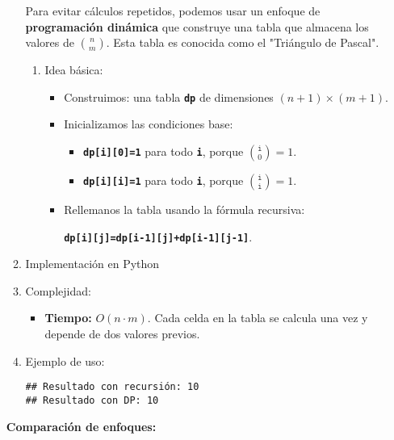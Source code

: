 \begin{enumerate}[label=\color{red}\textbf{\arabic*)}]
\begin{enumerate}[label=\color{red}\alph*)]
    Para evitar cálculos repetidos, podemos usar un enfoque de \textbf{programación dinámica} que construye una tabla que almacena los valores de $\binom{n}{m} $. Esta tabla es conocida como el "Triángulo de Pascal".
    \begin{enumerate}[label=\arabic*)]
      \item Idea básica:
        \begin{itemize}[label=\textbullet]
          \item Construimos: una tabla \textbf{\texttt{dp}} de dimensiones $(n+1)\times (m+1)$.
          \item Inicializamos las condiciones base:
            \begin{itemize}[label=\textbullet]
              \item \textbf{\texttt{dp[i][0]=1}} para todo \textbf{\texttt{i}}, porque $\binom{\mathtt{i} }{0}=1 $.
              \item \textbf{\texttt{dp[i][i]=1}} para todo \textbf{\texttt{i}}, porque $\binom{\mathtt{i}}{\mathtt{i}}=1$.
            \end{itemize}
          \item Rellemanos la tabla usando la fórmula recursiva:
            \begin{center}
              \textbf{\texttt{dp[i][j]=dp[i-1][j]+dp[i-1][j-1]}}. 
            \end{center}
        \end{itemize}
    \end{enumerate}
  \item Implementación en Python
    
  \item Complejidad:
    \begin{itemize}[label=\textbullet]
      \item \textbf{Tiempo:} $O(n\cdot m)$. Cada celda en la tabla se calcula una vez y depende de dos valores previos. 
    \end{itemize}
  \item Ejemplo de uso:
    
    \begin{verbatim}
## Resultado con recursión: 10
## Resultado con DP: 10
    \end{verbatim}
\end{enumerate}
\textbf{Comparación de enfoques:}
\begin{center}
  \begin{tabular}{|l|c|p{5cm}|}
    \hline

\end{tabular}
\end{center}
\end{enumerate}

